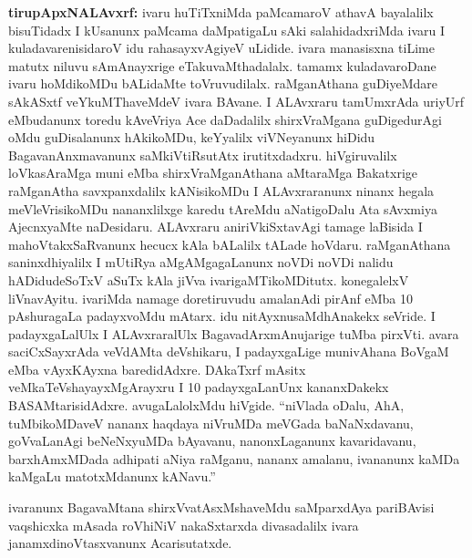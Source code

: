 {\large\textbf{tirupApxNALAvxrf:}} ivaru huTiTxniMda paMcamaroV athavA bayalalilx bisuTidadx I kUsanunx paMcama daMpatigaLu sAki salahidadxriMda ivaru I kuladavarenisidaroV idu rahasayxvAgiyeV uLidide. ivara manasisxna tiLime matutx niluvu sAmAnayxrige eTakuvaMthadalalx. tamamx kuladavaroDane ivaru hoMdikoMDu bALidaMte toVruvudilalx. raMganAthana guDiyeMdare sAkASxtf veYkuMThaveMdeV ivara BAvane. I ALAvxraru tamUmxrAda uriyUrf eMbudanunx toredu kAveVriya Ace daDadalilx shirxVraMgana guDigedurAgi oMdu guDisalanunx hAkikoMDu, keYyalilx viVNeyanunx hiDidu BagavanAnxmavanunx saMkiVtiRsutAtx irutitxdadxru. hiVgiruvalilx loVkasAraMga muni eMba shirxVraMganAthana aMtaraMga Bakatxrige raMganAtha savxpanxdalilx kANisikoMDu I ALAvxraranunx ninanx hegala meVleVrisikoMDu nananxlilxge karedu tAreMdu aNatigoDalu Ata sAvxmiya AjecnxyaMte naDesidaru. ALAvxraru aniriVkiSxtavAgi tamage laBisida I mahoVtakxSaRvanunx hecucx kAla bALalilx tALade hoVdaru. raMganAthana saninxdhiyalilx I mUtiRya aMgAMgagaLanunx noVDi noVDi nalidu hADidudeSoTxV aSuTx kAla jiVva ivarigaMTikoMDitutx. konegalelxV liVnavAyitu. ivariMda namage doretiruvudu amalanAdi pirAnf eMba 10 pAshuragaLa padayxvoMdu mAtarx. idu nitAyxnusaMdhAnakekx seVride. I padayxgaLalUlx I ALAvxraralUlx BagavadArxmAnujarige tuMba pirxVti. avara saciCxSayxrAda veVdAMta deVshikaru, I padayxgaLige munivAhana BoVgaM eMba vAyxKAyxna baredidAdxre. DAkaTxrf mAsitx veMkaTeVshayayxMgArayxru I 10 padayxgaLanUnx kananxDakekx BASAMtarisidAdxre. avugaLalolxMdu hiVgide. ``niVlada oDalu, AhA, tuMbikoMDaveV nananx haqdaya niVruMDa meVGada baNaNxdavanu, goVvaLanAgi beNeNxyuMDa bAyavanu, nanonxLaganunx kavaridavanu, barxhAmxMDada adhipati aNiya raMganu, nananx amalanu, ivananunx kaMDa kaMgaLu matotxMdanunx kANavu.''

ivaranunx BagavaMtana shirxVvatAsxMshaveMdu saMparxdAya pariBAvisi vaqshicxka mAsada roVhiNiV nakaSxtarxda divasadalilx ivara janamxdinoVtasxvanunx Acarisutatxde.

